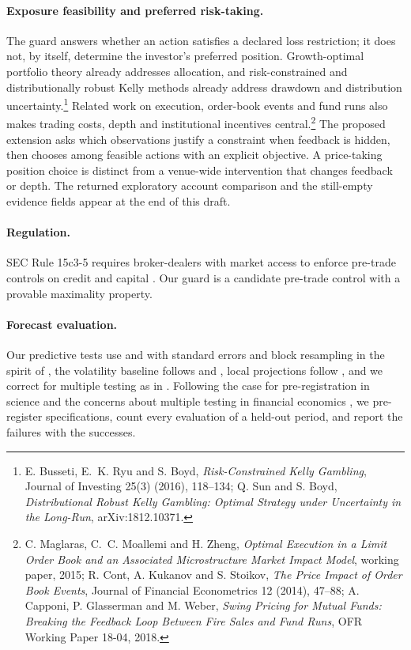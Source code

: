 \documentclass[12pt]{article}
\theoremstyle{definition}
\theoremstyle{remark}
\begin{document}
\paragraph{Exposure feasibility and preferred risk-taking.} The guard answers whether an action satisfies a declared loss restriction; it does not, by itself, determine the investor's preferred position. Growth-optimal portfolio theory already addresses allocation, and risk-constrained and distributionally robust Kelly methods already address drawdown and distribution uncertainty.\footnote{E. Busseti, E.~K. Ryu and S. Boyd, \emph{Risk-Constrained Kelly Gambling}, Journal of Investing 25(3) (2016), 118--134; Q. Sun and S. Boyd, \emph{Distributional Robust Kelly Gambling: Optimal Strategy under Uncertainty in the Long-Run}, arXiv:1812.10371.} Related work on execution, order-book events and fund runs also makes trading costs, depth and institutional incentives central.\footnote{C. Maglaras, C.~C. Moallemi and H. Zheng, \emph{Optimal Execution in a Limit Order Book and an Associated Microstructure Market Impact Model}, working paper, 2015; R. Cont, A. Kukanov and S. Stoikov, \emph{The Price Impact of Order Book Events}, Journal of Financial Econometrics 12 (2014), 47--88; A. Capponi, P. Glasserman and M. Weber, \emph{Swing Pricing for Mutual Funds: Breaking the Feedback Loop Between Fire Sales and Fund Runs}, OFR Working Paper 18-04, 2018.} The proposed extension asks which observations justify a constraint when feedback is hidden, then chooses among feasible actions with an explicit objective. A price-taking position choice is distinct from a venue-wide intervention that changes feedback or depth. The returned exploratory account comparison and the still-empty evidence fields appear at the end of this draft.
\paragraph{Regulation.} SEC Rule 15c3-5 requires broker-dealers with market access to enforce pre-trade controls on credit and capital \citep{sec2010}. Our guard is a candidate pre-trade control with a provable maximality property.

\paragraph{Forecast evaluation.} Our predictive tests use \citet{clark2007} and \citet{diebold1995} with \citet{newey1987} standard errors and block resampling in the spirit of \citet{kunsch1989}, the volatility baseline follows \citet{corsi2009} and \citet{riskmetrics1996}, local projections follow \citet{jorda2005}, and we correct for multiple testing as in \citet{holm1979}. Following the case for pre-registration in science \citep{nosek2018} and the concerns about multiple testing in financial economics \citep{harvey2016,harvey2017}, we pre-register specifications, count every evaluation of a held-out period, and report the failures with the successes.
\end{document}
